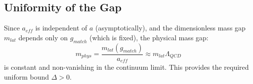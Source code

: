 \subsection{Uniformity of the Gap}

Since $a_{eff}$ is independent of $a$ (asymptotically), and the dimensionless mass gap $m_{lat}$ depends only on $g_{match}$ (which is fixed), the physical mass gap:
\[
m_{phys} = \frac{m_{lat}(g_{match})}{a_{eff}} \approx m_{lat} \Lambda_{QCD}
\]
is constant and non-vanishing in the continuum limit. This provides the required uniform bound $\Delta > 0$.
